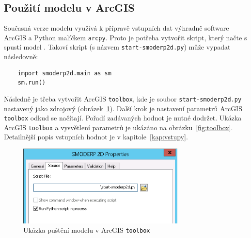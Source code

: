 \subsection{Použití modelu v ArcGIS}
  
  Současná verze modelu \smod využívá k přípravě vstupních dat výhradně software ArcGIS a Python malíčkem {\tt arcpy}. Proto je potřeba vytvořit skript, který načte s spustí model \smod. Takoví skript (s názvem {\tt start-smoderp2d.py}) může vypadat následovně:
  \begin{lstlisting}
    import smoderp2d.main as sm
    sm.run()
  \end{lstlisting}
  
  Následně je třeba vytvořit ArcGIS {\tt toolbox}, kde je soubor {\tt start-smoderp2d.py} nastavený jako zdrojový (obrázek~\ref{fig:tbsource}). Další krok je nastavení parametrů ArcGIS {\tt toolbox} odkud se načítají. Pořadí zadávaných hodnot je nutné dodržet. Ukázka ArcGIS {\tt toolbox} a vysvětlení parametrů je ukázáno na obrázku~\ref{fig:toolbox}. Detailnější popis vstupních hodnot je v kapitole~\ref{kap:vstupy}.
  
  \begin{figure}
    \centering
    \includegraphics[width=0.75\textwidth]{./img/start-smoderp.png}
    \caption{Ukázka puštění modelu \smod v ArcGIS {\tt toolbox}}
    \label{fig:tbsource}
  \end{figure}  
  
